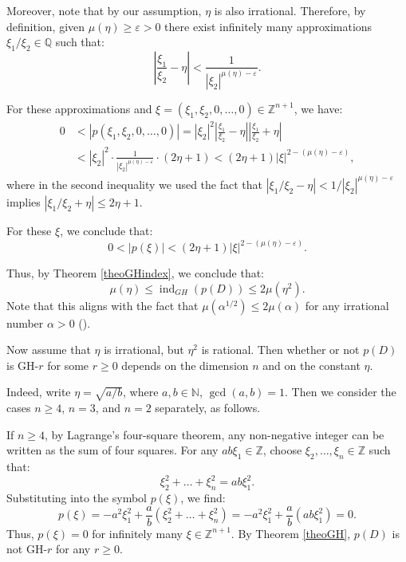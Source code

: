 \documentclass[11pt]{amsart}
\numberwithin{equation}{section}
\theoremstyle{definition}
\begin{document}
	Moreover, note that by our assumption, $\eta$ is also irrational. Therefore, by definition, given $\mu(\eta)\geq\varepsilon>0$ there exist infinitely many approximations $\xi_1/\xi_2\in\mathbb{Q}$ such that:
	\[
	\left| \frac{\xi_1}{\xi_2} - \eta \right| < \frac{1}{|\xi_2|^{\mu(\eta)-\varepsilon}}.
	\]

	For these approximations and $\xi = (\xi_1, \xi_2, 0, \dots, 0) \in \mathbb{Z}^{n+1}$, we have:
	\begin{align*}
		0 & < |p(\xi_1, \xi_2, 0, \dots, 0)| = |\xi_2|^2 \left| \frac{\xi_1}{\xi_2} - \eta \right| \left| \frac{\xi_1}{\xi_2} + \eta \right| \\
		&< |\xi_2|^2 \cdot \frac{1}{|\xi_2|^{\mu(\eta)-\varepsilon}} \cdot (2\eta + 1) 
		< (2\eta + 1)|\xi|^{2-(\mu(\eta)-\varepsilon)},
	\end{align*}
	where in the second inequality we used the fact that $\left| \xi_1/\xi_2 - \eta \right| < 1/|\xi_2|^{\mu(\eta)-\varepsilon}$ implies $\left| \xi_1/\xi_2 + \eta \right| \leq 2\eta + 1$.
	

    For these $\xi$, we conclude that:
	\[
	0 < |p(\xi)| < (2\eta + 1) |\xi|^{2-(\mu(\eta)-\varepsilon)}.
	\]
	
	Thus, by Theorem \ref{theoGHindex}, we conclude that:
	\[
	\mu(\eta) \leq \operatorname{ind}_{GH}(p(D)) \leq 2\mu(\eta^2).
	\]
    Note that this aligns with the fact that $\mu(\alpha^{1/2})\leq 2\mu(\alpha)$ for any irrational number $\alpha>0$ (\cite{Borwein}).
    
	Now assume that $\eta$ is irrational, but $\eta^2$ is rational. Then whether or not $p(D)$ is GH-$r$ for some $r \geq 0$ depends on the dimension $n$ and on the constant $\eta$. 
	
	Indeed, write $\eta = \sqrt{a/b}$, where $a, b \in \mathbb{N}$, $\gcd(a, b) = 1$. Then we consider the cases $n \geq 4$, $n = 3$, and $n = 2$ separately, as follows.
	
	\smallskip
	If $n \geq 4$, by Lagrange's four-square theorem, any non-negative integer can be written as the sum of four squares. For any $ab \xi_1 \in \mathbb{Z}$, choose $\xi_2, \dots, \xi_n \in \mathbb{Z}$ such that:
	\[
	\xi_2^2 + \dots + \xi_n^2 = ab \xi_1^2.
	\]
	Substituting into the symbol $p(\xi)$, we find:
	\[
	p(\xi) = -a^2 \xi_1^2 + \frac{a}{b} (\xi_2^2 + \dots + \xi_n^2) = -a^2 \xi_1^2 + \frac{a}{b} (ab \xi_1^2) = 0.
	\]
	Thus, $p(\xi) = 0$ for infinitely many $\xi \in \mathbb{Z}^{n+1}$. By Theorem \ref{theoGH}, $p(D)$ is not GH-$r$ for any $r \geq 0$.
	
\end{document}
